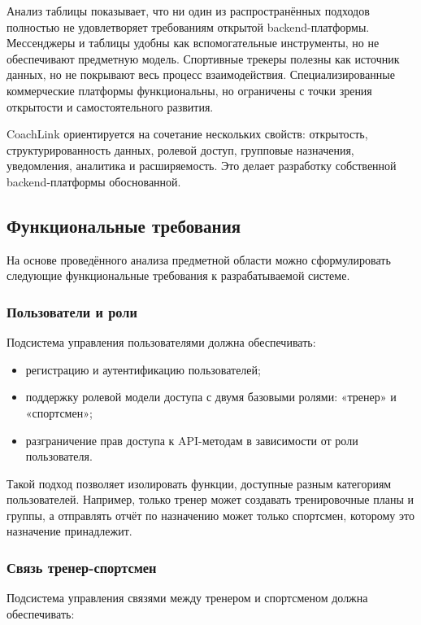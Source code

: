 Анализ таблицы показывает, что ни один из распространённых подходов полностью не удовлетворяет требованиям открытой backend-платформы. Мессенджеры и таблицы удобны как вспомогательные инструменты, но не обеспечивают предметную модель. Спортивные трекеры полезны как источник данных, но не покрывают весь процесс взаимодействия. Специализированные коммерческие платформы функциональны, но ограничены с точки зрения открытости и самостоятельного развития.

CoachLink ориентируется на сочетание нескольких свойств: открытость, структурированность данных, ролевой доступ, групповые назначения, уведомления, аналитика и расширяемость. Это делает разработку собственной backend-платформы обоснованной.

\subsection{Функциональные требования}

На основе проведённого анализа предметной области можно сформулировать следующие функциональные требования к разрабатываемой системе.

\subsubsection{Пользователи и роли}

Подсистема управления пользователями должна обеспечивать:

\begin{itemize}
\tightlist
\item
  регистрацию и аутентификацию пользователей;
\item
  поддержку ролевой модели доступа с двумя базовыми ролями: «тренер» и «спортсмен»;
\item
  разграничение прав доступа к API-методам в зависимости от роли пользователя.
\end{itemize}

Такой подход позволяет изолировать функции, доступные разным категориям пользователей. Например, только тренер может создавать тренировочные планы и группы, а отправлять отчёт по назначению может только спортсмен, которому это назначение принадлежит.

\subsubsection{Связь тренер-спортсмен}

Подсистема управления связями между тренером и спортсменом должна обеспечивать:

